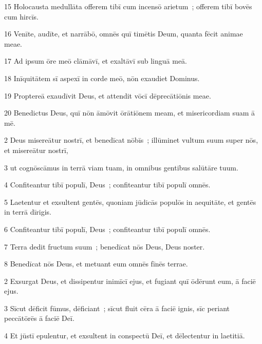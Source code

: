 \psalmVerse
  {\phantom{0}15}
  {Holocausta medullāta offerem tibī cum incensō arietum~; offerem tibī bovēs cum hircīs.}


\psalmVerse
  {\phantom{0}16}
  {Venīte, audīte, et narrābō, omnēs quī timētis Deum, quanta fēcit animae meae.}


\psalmVerse
  {\phantom{0}17}
  {Ad ipsum ōre meō clāmāvī, et exaltāvī sub linguā meā.}


\psalmVerse
  {\phantom{0}18}
  {Inīquitātem sī aspexī in corde meō, nōn exaudiet Dominus.}


\psalmVerse
  {\phantom{0}19}
  {Proptereā exaudīvit Deus, et attendit vōcī dēprecātiōnis meae.}


\psalmVerse
  {\phantom{0}20}
  {Benedictus Deus, quī nōn āmōvit ōrātiōnem meam, et misericordiam suam ā mē.}



\psalmVerse
  {\phantom{00}2}
  {Deus misereātur nostrī, et benedīcat nōbīs~; illūminet vultum suum super nōs, et misereātur nostrī,}


\psalmVerse
  {\phantom{00}3}
  {ut cognōscāmus in terrā viam tuam, in omnibus gentibus salūtāre tuum.}


\psalmVerse
  {\phantom{00}4}
  {Confiteantur tibī populī, Deus~; confiteantur tibī populī omnēs.}


\psalmVerse
  {\phantom{00}5}
  {Laetentur et exsultent gentēs, quoniam jūdicās populōs in aequitāte, et gentēs in terrā dīrigis.}


\psalmVerse
  {\phantom{00}6}
  {Confiteantur tibī populī, Deus~; confiteantur tibī populī omnēs.}


\psalmVerse
  {\phantom{00}7}
  {Terra dedit fructum suum~; benedīcat nōs Deus, Deus noster.}


\psalmVerse
  {\phantom{00}8}
  {Benedīcat nōs Deus, et metuant eum omnēs fīnēs terrae.}




\psalmVerse
  {\phantom{00}2}
  {Exsurgat Deus, et dissipentur inimīcī ejus, et fugiant quī ōdērunt eum, ā faciē ejus.}


\psalmVerse
  {\phantom{00}3}
  {Sīcut dēficit fūmus, dēficiant~; sīcut fluit cēra ā faciē ignis, sīc periant peccātōrēs ā faciē Deī.}


\psalmVerse
  {\phantom{00}4}
  {Et jūstī epulentur, et exsultent in conspectū Deī, et dēlectentur in laetitiā.}


